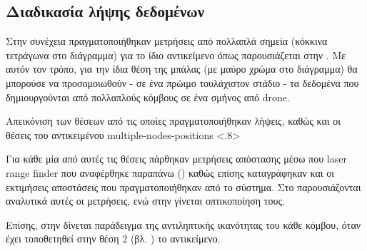 
\subsection{Διαδικασία λήψης δεδομένων} \label{sec:multiple-nodes-data-collection}
Στην συνέχεια πραγματοποιήθηκαν μετρήσεις από πολλαπλά σημεία (κόκκινα τε\-τρά\-γω\-να στο διάγραμμα) για το ίδιο αντικείμενο όπως παρουσιάζεται στην .
Με αυτόν τον τρόπο, για την ίδια θέση της μπάλας (με μαύρο χρώμα στο διάγραμμα) θα μπορούσε να προσομοιωθούν - σε ένα πρώιμο τουλάχιστον στάδιο - τα δεδομένα που δημιουργούνται από πολλαπλούς κόμβους σε ένα σμήνος από drone. 

{Απεικόνιση των θέσεων από τις οποίες πραγματοποιήθηκαν λήψεις, καθώς και οι θέσεις του αντικειμένου}%
{multiple-nodes-positions}%
<.8>

Για κάθε μία από αυτές τις θέσεις πάρθηκαν μετρήσεις απόστασης μέσω που laser range finder που αναφέρθηκε παραπάνω () καθώς επίσης καταγράφηκαν και οι εκτιμήσεις αποστάσεις που πραγματοποιήθηκαν από το σύστημα. Στο  παρουσιάζονται αναλυτικά αυτές οι μετρήσεις, ενώ στην  γίνεται οπτικοποίηση τους.

Επίσης, στην  δίνεται παράδειγμα της αντιληπτικής ικανότητας του κάθε κόμβου, όταν έχει τοποθετηθεί στην θέση 2 (βλ. ) το αντικείμενο.

